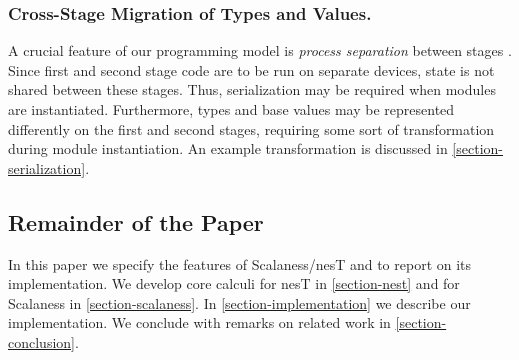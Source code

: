 %
%
%

\subsubsection{Cross-Stage Migration of Types and Values.} 

A crucial feature of our programming model is \emph{process separation} between stages
\cite{FramedML}. Since first and second stage code are to be run on separate devices, state is
not shared between these stages. Thus, serialization may be required when modules are
instantiated. Furthermore, types and base values may be represented differently on the first and
second stages, requiring some sort of transformation during module instantiation. An example
transformation is discussed in \autoref{section-serialization}.

\subsection{Remainder of the Paper} 

In this paper we specify the features of Scalaness/nesT and to report on its implementation. We
develop core calculi for nesT in \autoref{section-nest} and for Scalaness in
\autoref{section-scalaness}.
In \autoref{section-implementation} we describe our implementation. We conclude with remarks on
related work in \autoref{section-conclusion}.

